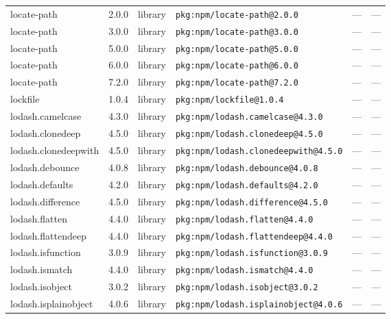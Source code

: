 \documentclass[11pt,a4paper]{article}
\begin{document}
\begin{longtable}{|p{4cm}|p{2cm}|p{1.6cm}|p{5cm}|p{1.5cm}|p{3.5cm}|}
\raggedright locate-path & 2.0.0 & library & \small\texttt{pkg:npm/locate-path@2.0.0} & — & \small — \\
\raggedright locate-path & 3.0.0 & library & \small\texttt{pkg:npm/locate-path@3.0.0} & — & \small — \\
\raggedright locate-path & 5.0.0 & library & \small\texttt{pkg:npm/locate-path@5.0.0} & — & \small — \\
\raggedright locate-path & 6.0.0 & library & \small\texttt{pkg:npm/locate-path@6.0.0} & — & \small — \\
\raggedright locate-path & 7.2.0 & library & \small\texttt{pkg:npm/locate-path@7.2.0} & — & \small — \\
\raggedright lockfile & 1.0.4 & library & \small\texttt{pkg:npm/lockfile@1.0.4} & — & \small — \\
\raggedright lodash.camelcase & 4.3.0 & library & \small\texttt{pkg:npm/lodash.camelcase@4.3.0} & — & \small — \\
\raggedright lodash.clonedeep & 4.5.0 & library & \small\texttt{pkg:npm/lodash.clonedeep@4.5.0} & — & \small — \\
\raggedright lodash.clonedeepwith & 4.5.0 & library & \small\texttt{pkg:npm/lodash.clonedeepwith@4.5.0} & — & \small — \\
\raggedright lodash.debounce & 4.0.8 & library & \small\texttt{pkg:npm/lodash.debounce@4.0.8} & — & \small — \\
\raggedright lodash.defaults & 4.2.0 & library & \small\texttt{pkg:npm/lodash.defaults@4.2.0} & — & \small — \\
\raggedright lodash.difference & 4.5.0 & library & \small\texttt{pkg:npm/lodash.difference@4.5.0} & — & \small — \\
\raggedright lodash.flatten & 4.4.0 & library & \small\texttt{pkg:npm/lodash.flatten@4.4.0} & — & \small — \\
\raggedright lodash.flattendeep & 4.4.0 & library & \small\texttt{pkg:npm/lodash.flattendeep@4.4.0} & — & \small — \\
\raggedright lodash.isfunction & 3.0.9 & library & \small\texttt{pkg:npm/lodash.isfunction@3.0.9} & — & \small — \\
\raggedright lodash.ismatch & 4.4.0 & library & \small\texttt{pkg:npm/lodash.ismatch@4.4.0} & — & \small — \\
\raggedright lodash.isobject & 3.0.2 & library & \small\texttt{pkg:npm/lodash.isobject@3.0.2} & — & \small — \\
\raggedright lodash.isplainobject & 4.0.6 & library & \small\texttt{pkg:npm/lodash.isplainobject@4.0.6} & — & \small — \\

\end{longtable}
\end{document}
